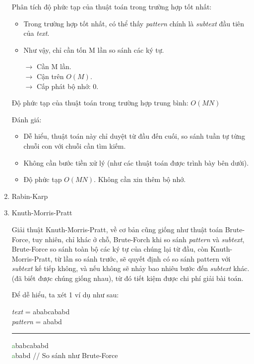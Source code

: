 \documentclass[a4paper,11pt]{article}
\begin{document}
\begin{enumerate}
			Phân tích độ phức tạp của thuật toán trong trường hợp tốt nhất:
			\begin{itemize}
				\item Trong trường hợp tốt nhất, có thể thấy \textit{pattern} chính là \textit{subtext} đầu tiên của \textit{text}.
				\item Như vậy, chỉ cần tốn M lần so sánh các ký tự.
				
				$\to$ Cần M lần. \\
				$\to$ Cận trên $O(M)$. \\
				$\to$ Cấp phát bộ nhớ: 0.
			\end{itemize}

			Độ phức tạp của thuật toán trong trường hợp trung bình: $O(MN)$
			
			Đánh giá:
			\begin{itemize}
				\item Dễ hiểu, thuật toán này chỉ duyệt từ đầu đến cuối, so sánh tuần tự từng chuỗi con với chuỗi cần tìm kiếm.
				\item Không cần bước tiền xử lý (như các thuật toán được trình bày bên dưới).
				\item Độ phức tạp $O(MN)$. Không cần xin thêm bộ nhớ.
			\end{itemize}

		\item Rabin-Karp
		\item Knuth-Morris-Pratt
		
			Giải thuật Knuth-Morris-Pratt, về cơ bản cũng giống như thuật toán Brute-Force, 
			tuy nhiên, chỉ khác ở chỗ, Brute-Forch khi so sánh \textit{pattern} và \textit{subtext}, Brute-Force so sánh toàn bộ 
			các ký tự của chúng lại từ đầu, còn Knuth-Morris-Pratt, từ lần so sánh trước, sẽ quyết định có so sánh pattern với \textit{subtext} kế tiếp không, 
			và nếu không sẽ nhảy bao nhiêu bước đến \textit{subtext} khác. 
			(đã biết được chúng giống nhau), từ đó tiết kiệm được chi phí giải bài toán.

			Để dễ hiểu, ta xét 1 ví dụ như sau: 
			
			\textit{text} \hspace*{6mm}= ababcababd\\
			\textit{pattern} \hspace*{0.1mm}= ababd
			
			\vspace*{4mm}
			\hrule
			\textcolor{ForestGreen}{a}babcababd\\
			\textcolor{ForestGreen}{a}babd \hspace*{1.8cm} // So sánh như Brute-Force


\end{enumerate}
\end{document}
